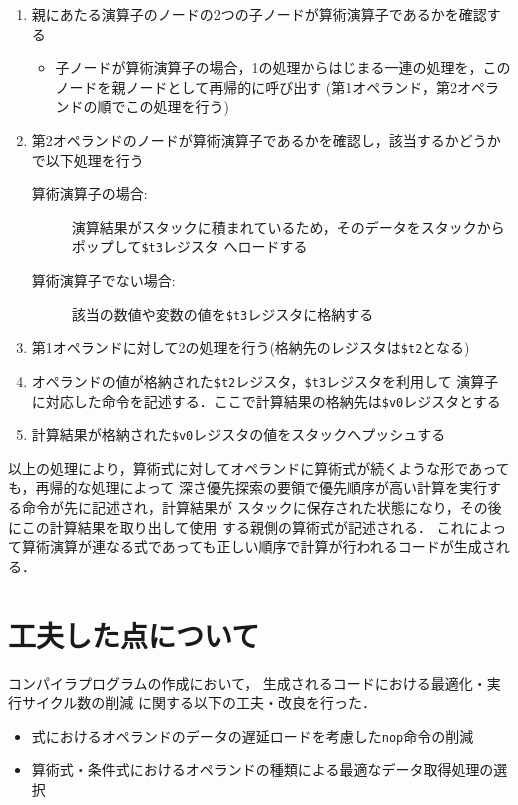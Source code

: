 \begin{enumerate}
  \item 親にあたる演算子のノードの2つの子ノードが算術演算子であるかを確認する
  \begin{itemize}
    \item 子ノードが算術演算子の場合，1の処理からはじまる一連の処理を，このノードを親ノードとして再帰的に呼び出す
    (第1オペランド，第2オペランドの順でこの処理を行う)
  \end{itemize}
  \item 第2オペランドのノードが算術演算子であるかを確認し，該当するかどうかで以下処理を行う
  \begin{description}
    \item[算術演算子の場合:] 演算結果がスタックに積まれているため，そのデータをスタックからポップして\verb|$t3|レジスタ 
    へロードする
    \item[算術演算子でない場合:] 該当の数値や変数の値を\verb|$t3|レジスタに格納する   
  \end{description}
  \item 第1オペランドに対して2の処理を行う(格納先のレジスタは\verb|$t2|となる)
  \item オペランドの値が格納された\verb|$t2|レジスタ，\verb|$t3|レジスタを利用して
  演算子に対応した命令を記述する．ここで計算結果の格納先は\verb|$v0|レジスタとする
  \item 計算結果が格納された\verb|$v0|レジスタの値をスタックへプッシュする
\end{enumerate}
以上の処理により，算術式に対してオペランドに算術式が続くような形であっても，再帰的な処理によって
深さ優先探索の要領で優先順序が高い計算を実行する命令が先に記述され，計算結果が
スタックに保存された状態になり，その後にこの計算結果を取り出して使用
する親側の算術式が記述される．
これによって算術演算が連なる式であっても正しい順序で計算が行われるコードが生成される．

\section{工夫した点について}

コンパイラプログラムの作成において，
生成されるコードにおける最適化・実行サイクル数の削減
に関する以下の工夫・改良を行った．
\begin{itemize}
  \item 式におけるオペランドのデータの遅延ロードを考慮した\verb|nop|命令の削減
  \item 算術式・条件式におけるオペランドの種類による最適なデータ取得処理の選択
\end{itemize}

